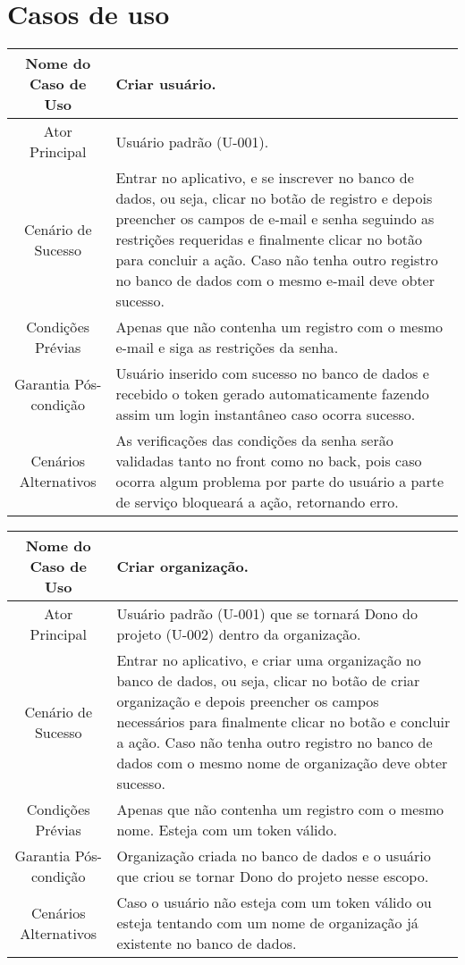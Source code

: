 \chapter{Casos de uso}

\vspace{1cm}

\begin{tabularx}{\textwidth}{|c|X|}
\hline
Nome do Caso de Uso & Criar usuário. \\ \hline
Ator Principal & Usuário padrão (U-001). \\ \hline
Cenário de Sucesso & Entrar no aplicativo, e se inscrever no banco de dados, ou seja, clicar no botão de registro e depois preencher os campos de e-mail e senha seguindo as restrições requeridas e finalmente clicar no botão para concluir a ação. Caso não tenha outro registro no banco de dados com o mesmo e-mail deve obter sucesso. \\ \hline
Condições Prévias & Apenas que não contenha um registro com o mesmo e-mail e siga as restrições da senha. \\ \hline
Garantia Pós-condição & Usuário inserido com sucesso no banco de dados e recebido o \gls{token} gerado automaticamente fazendo assim um login instantâneo caso ocorra sucesso. \\ \hline
Cenários Alternativos & As verificações das condições da senha serão validadas tanto no \gls{front} como no \gls{back}, pois caso ocorra algum problema por parte do usuário a parte de serviço bloqueará a ação, retornando erro. \\ \hline
\end{tabularx}

\vspace{1cm}

\begin{tabularx}{\textwidth}{|c|X|}
    \hline
    Nome do Caso de Uso & Criar organização. \\ \hline
    Ator Principal & Usuário padrão (U-001) que se tornará Dono do projeto (U-002) dentro da organização. \\ \hline
    Cenário de Sucesso & Entrar no aplicativo, e criar uma organização no banco de dados, ou seja, clicar no botão de criar organização e depois preencher os campos necessários para finalmente clicar no botão e concluir a ação. Caso não tenha outro registro no banco de dados com o mesmo nome de organização deve obter sucesso. \\ \hline
    Condições Prévias & Apenas que não contenha um registro com o mesmo nome. Esteja com um \gls{token} válido. \\ \hline
    Garantia Pós-condição & Organização criada no banco de dados e o usuário que criou se tornar Dono do projeto nesse escopo. \\ \hline
    Cenários Alternativos & Caso o usuário não esteja com um \gls{token} válido ou esteja tentando com um nome de organização já existente no banco de dados. \\ \hline
\end{tabularx}

